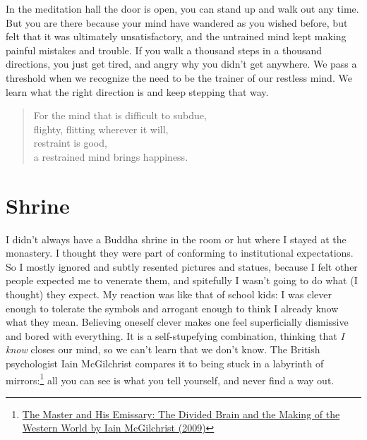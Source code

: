 In the meditation hall the door is open, you can stand up and walk out
any time. But you are there because your mind have wandered as you
wished before, but felt that it was ultimately unsatisfactory, and the
untrained mind kept making painful mistakes and trouble. If you walk a
thousand steps in a thousand directions, you just get tired, and angry
why you didn't get anywhere. We pass a threshold when we recognize the
need to be the trainer of our restless mind. We learn what the right
direction is and keep stepping that way.

\begin{quote}
For the mind that is difficult to subdue,\\
flighty, flitting wherever it will,\\
restraint is good,\\
a restrained mind brings happiness.

\bigskip

\end{quote}

\section{Shrine}


I didn't always have a Buddha shrine in the room or hut where I stayed
at the monastery. I thought they were part of conforming to
institutional expectations. So I mostly ignored and subtly resented
pictures and statues, because I felt other people expected me to
venerate them, and spitefully I wasn't going to do what (I thought) they
expect. My reaction was like that of school kids: I was clever enough to
tolerate the symbols and arrogant enough to think I already know what
they mean. Believing oneself clever makes one feel superficially
dismissive and bored with everything. It is a self-stupefying
combination, thinking that \emph{I know} closes our mind, so we can't
learn that we don't know. The British psychologist Iain McGilchrist
compares it to being stuck in a labyrinth of mirrors:\footnote{\href{https://www.goodreads.com/book/show/6968772-the-master-and-his-emissary}{The
  Master and His Emissary: The Divided Brain and the Making of the
  Western World by Iain McGilchrist (2009)}} all you can see is what you
tell yourself, and never find a way out.

